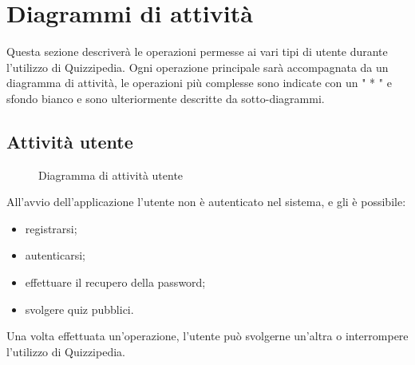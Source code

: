 \documentclass[a4paper, titlepage]{article}
\begin{document}
\newpage
\section{Diagrammi di attività}
Questa sezione descriverà le operazioni permesse ai vari tipi di utente durante l’utilizzo di Quizzipedia. Ogni operazione principale sarà accompagnata da un diagramma di attività, le operazioni più complesse sono indicate con un " * " e sfondo bianco e sono ulteriormente descritte da sotto-diagrammi.

\subsection{Attività utente}
\begin{figure}[H]
	\centering
	\noindent{}
	\caption{Diagramma di attività utente}
\end{figure}
All’avvio dell’applicazione l’utente non è autenticato nel sistema, e gli è possibile:
\begin{itemize}
	\item registrarsi;
	\item autenticarsi;
	\item effettuare il recupero della password;
	\item svolgere quiz pubblici.
\end{itemize}
Una volta effettuata un’operazione, l’utente può svolgerne un’altra o interrompere l’utilizzo di Quizzipedia.
\end{document}
